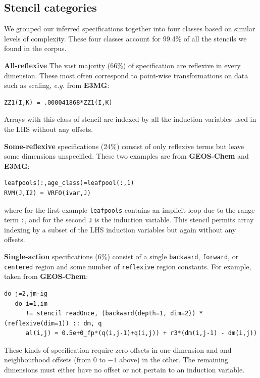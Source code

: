\documentclass[9pt]{sigplanconf}
\theoremstyle{definition}
\newcommand{\eg}{\emph{e.g.}}
\newcommand{\term}[1]{\texttt{#1}}
\begin{document}
\subsection{Stencil categories}

We grouped our inferred specifications together into four classes based on similar levels of complexity. These four classes account for 99.4\% of all the stencils we found in the corpus.

\textbf{All-reflexive} The vast majority (66\%) of specification are
reflexive in every dimension. These most often correspond
to point-wise transformations on data such as scaling, \eg{} from \textbf{E3MG}: \begin{verbatim}
ZZ1(I,K) = .000041868*ZZ1(I,K)
\end{verbatim}
Arrays with this class of stencil are indexed by all the induction
variables used in the LHS without any offsets.

\textbf{Some-reflexive} specifications (24\%) consist of only reflexive terms but
leave some dimensions unspecified. These two examples are from
\textbf{GEOS-Chem} and \textbf{E3MG}: 
\begin{verbatim}
leafpools(:,age_class)=leafpool(:,1)
RVM(J,I2) = VRFO(ivar,J)
\end{verbatim}
where for the first example \texttt{leafpools} contains an
implicit loop due to the range term \texttt{:}, and for the second \texttt{J} is
the induction variable. This stencil permits array indexing by a subset of the LHS induction variables but again without
any offsets.

\textbf{Single-action} specifications (6\%) consist of a single \term{backward},
\term{forward}, or \term{centered} region and some number of \term{reflexive}
region constants. For example, taken from \textbf{GEOS-Chem}: 
\begin{verbatim}
do j=2,jm-ig
   do i=1,im
      != stencil readOnce, (backward(depth=1, dim=2)) *(reflexive(dim=1)) :: dm, q
      al(i,j) = 0.5e+0_fp*(q(i,j-1)+q(i,j)) + r3*(dm(i,j-1) - dm(i,j))
\end{verbatim}
These kinds of specification require zero offsets in one dimension and 
and neighbourhood offsets (from 0 to $-1$ above) in the other.
The remaining dimensions must either have no offset or not pertain to
an induction variable.
\end{document}
